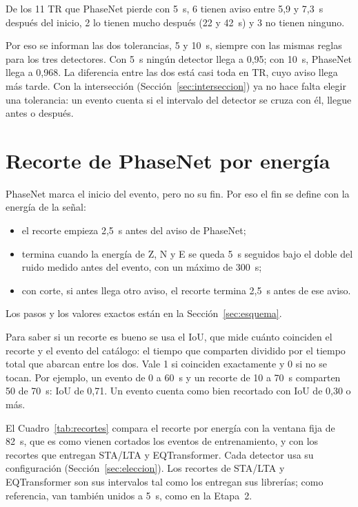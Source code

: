 \documentclass[11pt,a4paper,oneside,spanish,oldfontcommands]{memoir}
\begin{document}
De los 11 TR que PhaseNet pierde con 5~s, 6 tienen aviso entre 5,9 y 7,3~s
después del inicio, 2 lo tienen mucho después (22 y 42~s) y 3 no tienen
ninguno.

Por eso se informan las dos tolerancias, 5 y 10~s, siempre con las mismas reglas
para los tres detectores. Con 5~s ningún detector llega a 0,95; con 10~s,
PhaseNet llega a 0,968. La diferencia entre las dos está casi toda en TR, cuyo
aviso llega más tarde. Con la intersección (Sección~\ref{sec:interseccion}) ya
no hace falta elegir una tolerancia: un evento cuenta si el intervalo del
detector se cruza con él, llegue antes o después.

\section{Recorte de PhaseNet por energía}\label{sec:recorte}

PhaseNet marca el inicio del evento, pero no su fin. Por eso el fin se define
con la energía de la señal:

\begin{itemize}
\item el recorte empieza 2,5~s antes del aviso de PhaseNet;
\item termina cuando la energía de Z, N y E se queda 5~s seguidos bajo el doble
  del ruido medido antes del evento, con un máximo de 300~s;
\item con corte, si antes llega otro aviso, el recorte termina 2,5~s antes de
  ese aviso.
\end{itemize}

Los pasos y los valores exactos están en la Sección~\ref{sec:esquema}.

Para saber si un recorte es bueno se usa el IoU, que mide cuánto coinciden el
recorte y el evento del catálogo: el tiempo que comparten dividido por el
tiempo total que abarcan entre los dos. Vale 1 si coinciden exactamente y 0 si
no se tocan. Por ejemplo, un evento de 0 a 60~s y un recorte de 10 a 70~s
comparten 50 de 70~s: IoU de 0,71. Un evento cuenta como bien recortado con
IoU de 0,30 o más.

El Cuadro~\ref{tab:recortes} compara el recorte por energía con la ventana fija
de 82~s, que es como vienen cortados los eventos de entrenamiento, y con los
recortes que entregan STA/LTA y EQTransformer. Cada detector usa su
configuración (Sección~\ref{sec:eleccion}). Los recortes de STA/LTA y
EQTransformer son sus intervalos tal como los entregan sus librerías; como
referencia, van también unidos a 5~s, como en la Etapa~2.
\end{document}
